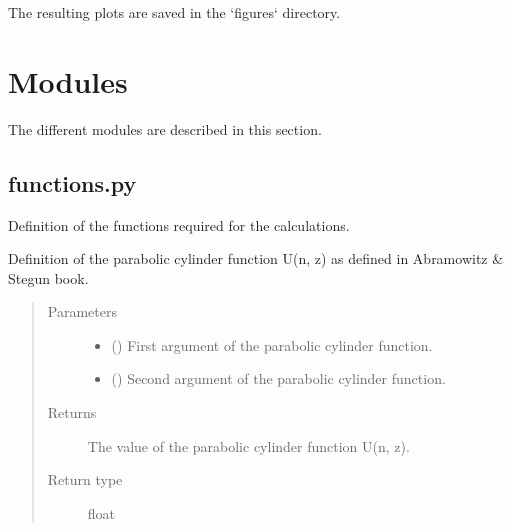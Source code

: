 \documentclass[letterpaper,10pt,english]{sphinxmanual}
\begin{document}
\sphinxAtStartPar
The resulting plots are saved in the ‘figures‘ directory.

\sphinxstepscope


\chapter{Modules}
\label{\detokenize{modules:modules}}\label{\detokenize{modules::doc}}
\sphinxAtStartPar
The different modules are described in this section.


\section{functions.py}
\label{\detokenize{modules:module-modules.functions}}\label{\detokenize{modules:functions-py}}
\sphinxAtStartPar
Definition of the functions required for the calculations.

\begin{fulllineitems}
\label{\detokenize{modules:modules.functions.U}}
\pysigstartsignatures
{}
\pysigstopsignatures
\sphinxAtStartPar
Definition of the parabolic cylinder function U(n, z) as defined in Abramowitz \& Stegun book.
\begin{quote}\begin{description}
\item[{Parameters}] \leavevmode\begin{itemize}
\item {} 
\sphinxAtStartPar
{} () \textendash{} First argument of the parabolic cylinder function.

\item {} 
\sphinxAtStartPar
{} () \textendash{} Second argument of the parabolic cylinder function.

\end{itemize}

\item[{Returns}] \leavevmode
\sphinxAtStartPar
The value of the parabolic cylinder function U(n, z).

\item[{Return type}] \leavevmode
\sphinxAtStartPar
float

\end{description}\end{quote}

\end{fulllineitems}
\end{document}
